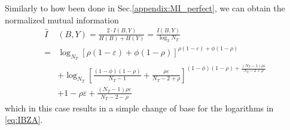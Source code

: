 Similarly to how been done in Sec.\ref{appendix:MI_perfect}, we can obtain the normalized mutual information
\begin{align}
    \hat{I}&(B,Y) = \frac{2\cdot I(B, Y)}{H(B) + H(Y)} = \frac{I(B, Y)}{\log_2 N_T}\nonumber\\
    =& \log_{N_T}\left[\rho (1 - \varepsilon) + \phi(1-\rho)\right]^{\rho (1 - \varepsilon)+ \phi(1-\rho)}\nonumber\\
    &+ \log_{N_T} \left [\frac{(1-\phi)(1-\rho)}{N_T-1} + \frac{\rho\varepsilon}{N_T-2+\rho}\right ]^{(1-\phi)(1-\rho) + \frac{(N_T-1)\rho\varepsilon}{N_T-2+\rho}}\nonumber\\
    &+ 1 - \rho\varepsilon + \frac{(N_T-1)\rho\varepsilon}{N_T-2-\rho}\nonumber
\end{align}
which in this case results in a simple change of base for the logarithms in \eqref{eq:IBZA}.

